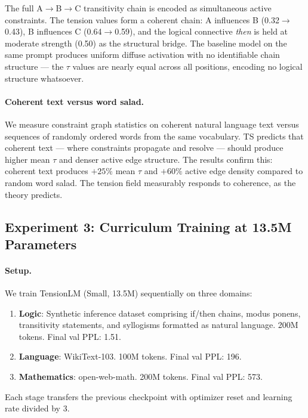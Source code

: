 \documentclass[10pt,a4paper]{article}
\begin{document}
The full A$\rightarrow$B$\rightarrow$C transitivity chain is encoded as simultaneous active constraints. The tension values form a coherent chain: A influences B (0.32$\rightarrow$0.43), B influences C (0.64$\rightarrow$0.59), and the logical connective \textit{then} is held at moderate strength (0.50) as the structural bridge. The baseline model on the same prompt produces uniform diffuse activation with no identifiable chain structure --- the $\tau$ values are nearly equal across all positions, encoding no logical structure whatsoever.

\paragraph{Coherent text versus word salad.} We measure constraint graph statistics on coherent natural language text versus sequences of randomly ordered words from the same vocabulary. TS predicts that coherent text --- where constraints propagate and resolve --- should produce higher mean $\tau$ and denser active edge structure. The results confirm this: coherent text produces $+25\%$ mean $\tau$ and $+60\%$ active edge density compared to random word salad. The tension field measurably responds to coherence, as the theory predicts.

\subsection{Experiment 3: Curriculum Training at 13.5M Parameters}

\paragraph{Setup.} We train TensionLM (Small, 13.5M) sequentially on three domains:
\begin{enumerate}[label=(\arabic*)]
    \item \textbf{Logic}: Synthetic inference dataset comprising if/then chains, modus ponens, transitivity statements, and syllogisms formatted as natural language. 200M tokens. Final val PPL: 1.51.
    \item \textbf{Language}: WikiText-103. 100M tokens. Final val PPL: 196.
    \item \textbf{Mathematics}: open-web-math. 200M tokens. Final val PPL: 573.
\end{enumerate}
Each stage transfers the previous checkpoint with optimizer reset and learning rate divided by 3.
\end{document}
